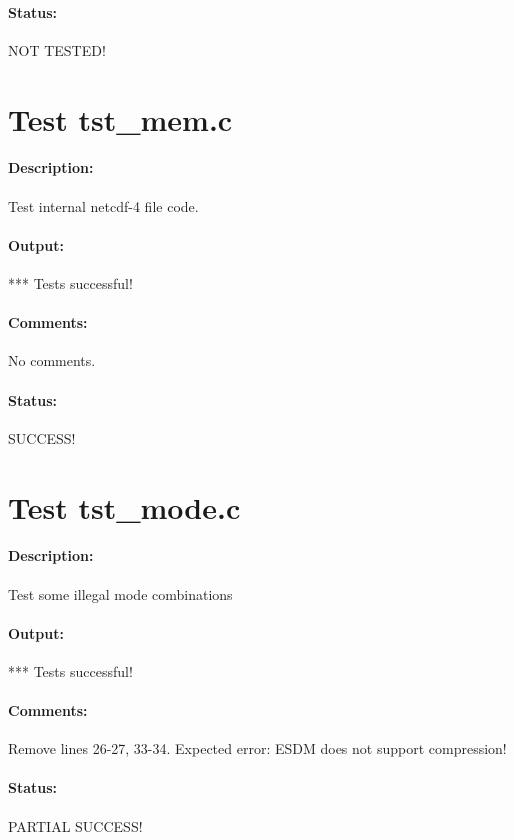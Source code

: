 \paragraph{Status:} NOT TESTED!

\section{Test tst\_mem.c}

\paragraph{Description:} Test internal netcdf-4 file code.

\paragraph{Output:} *** Tests successful!

\paragraph{Comments:} No comments.

\paragraph{Status:} SUCCESS!

\section{Test tst\_mode.c}

\paragraph{Description:} Test some illegal mode combinations

\paragraph{Output:} *** Tests successful!

\paragraph{Comments:} Remove lines 26-27, 33-34. Expected error: ESDM does not support compression!

\paragraph{Status:} PARTIAL SUCCESS!
